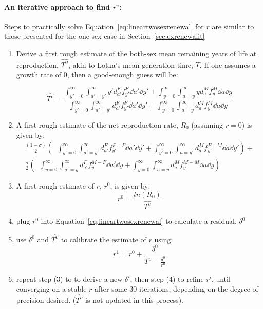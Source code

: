 \paragraph{An iterative approach to find $r^\upsilon$:}
\label{sec:exrenewalit2}
Steps to practically solve Equation~\eqref{eq:lineartwosexrenewal} for $r$ are
similar to those presented for the one-sex case in
Section~\ref{sec:exrenewalit}
\begin{enumerate}
  \item Derive a first rough estimate of the both-sex mean remaining years of
  life at reproduction, $\widehat{T^\upsilon}$, akin to Lotka's mean generation time,
  $T$. If one assumes a growth rate of $0$, then a good-enough guess will be:

\begin{equation}
\widehat{T^\upsilon} = \frac{\int _{y'=0}^\infty \int _{a'=y'}^\infty y'
d_{a'}^F f_{y'}^F \dd a' \dd y' + \int _{y=0}^\infty \int _{a=y}^\infty y
d_{a}^M f_{y}^M \dd a \dd y}{\int _{y'=0}^\infty \int _{a'=y'}^\infty
d_{a'}^F f_{y'}^F \dd a' \dd y' + \int _{y=0}^\infty \int _{a=y}^\infty
d_{a}^M f_{y}^M \dd a \dd y}
\end{equation}

  \item A first rough estimate of the net reproduction rate, $R_0$ (assuming
  $r=0$) is given by:
 \begin{equation}
 \begin{split}
 \frac{(1 - \sigma)}{2} \left(\;\;
            \int _{y'=0}^\infty \int _{a'=y'}^\infty 
                      d_{a'}^F f_{y'}^{F-F} \dd a' \dd y' + 
            \int _{y'=0}^\infty \int _{a=y'}^\infty 
                      d_{a}^M f_{y'}^{F-M} \dd a \dd y'\right) + \\ 
     \frac{\sigma}{2} \left(\;\;
            \int _{y=0}^\infty \int _{a'=y}^\infty 
                      d_{a'}^F f_{y}^{M-F} \dd a' \dd y + 
            \int _{y=0}^\infty \int _{a=y}^\infty 
                      d_{a}^M f_{y}^{M-M} \dd a \dd y \right)
 \end{split}
 \end{equation}
  \item A first rough estimate of $r$, $r^0$, is given by:
   \begin{equation}
   r^0 = \frac{ln(R_0)}{\widehat{T^\upsilon}}
   \end{equation}
  \item plug $r^0$ into Equation~\ref{eq:lineartwosexrenewal} to calculate a
  residual, $\delta^0$
  \item use $\delta^0$ and $\widehat{T^\upsilon}$ to calibrate the estimate of $r$
  using:
  \begin{equation}
  r^{1} = r^0 + \frac{\delta^0}{\widehat{T^\upsilon} - \frac{\delta^0}{r^0}}
  \end{equation}
  \item repeat step (3) to to derive a new $\delta^i$, then step (4) to refine
  $r^i$, until converging on a stable $r$ after some 30 iterations,
  depending on the degree of precision desired. ($\widehat{T^\upsilon}$ is not updated
  in this process).
\end{enumerate}

